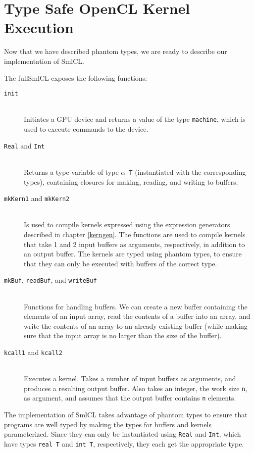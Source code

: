 \section{Type Safe OpenCL Kernel Execution}

Now that we have described phantom types, we are ready to describe
our implementation of SmlCL.

The fullSmlCL exposes the following functions:

\begin{description}
  \item[\texttt{init}] \hfill \\ Initiates a GPU device and returns a value of
    the type \texttt{machine}, which is used to execute commands to
    the device.
  \item[\texttt{Real} and \texttt{Int}] \hfill \\ Returns a type variable of
    type \texttt{$\alpha$ T} (instantiated with the corresponding
    types), containing closures for making, reading, and writing to
    buffers.
  \item[\texttt{mkKern1} and \texttt{mkKern2}] \hfill \\ Is used to
    compile kernels expressed using the expression generators
    described in chapter \ref{kerngen}. The functions are used to
    compile kernels that take 1 and 2 input buffers as arguments,
    respectively, in addition to an output buffer. The kernels are
    typed using phantom types, to ensure that they can only be
    executed with buffers of the correct type.
  \item[\texttt{mkBuf}, \texttt{readBuf}, and \texttt{writeBuf}]
    \hfill \\ Functions for handling buffers. We can create a new
    buffer containing the elements of an input array, read the
    contents of a buffer into an array, and write the contents of an
    array to an already existing buffer (while making sure that the
    input array is no larger than the size of the buffer).
  \item[\texttt{kcall1} and \texttt{kcall2}] \hfill \\ Executes a
    kernel. Takes a number of input buffers as arguments, and produces
    a resulting output buffer. Also takes an integer, the work size
    \texttt{n}, as argument, and assumes that the output buffer
    contains \texttt{n} elements.
\end{description}

The implementation of SmlCL takes advantage of phantom types to
ensure that programs are well typed by making the types for buffers
and kernels parameterized. Since they can only be instantiated using
\texttt{Real} and \texttt{Int}, which have types \texttt{real T} and
\texttt{int T}, respectively, they each get the appropriate type.
